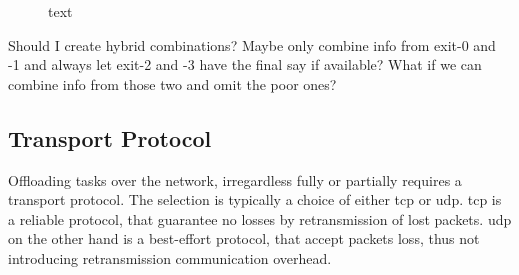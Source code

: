 \begin{figure}
	\centering
	\hfill
	\caption[short text]{text}
	\label{fig:info-combi}
\end{figure}

Should I create hybrid combinations? Maybe only combine info from exit-0 and -1 and always let exit-2 and -3 have the final say if available? What if we can combine info from those two and omit the poor ones? 


\subsection{Transport Protocol} 

Offloading tasks over the network, irregardless fully or partially requires a transport protocol. The selection is typically a choice of either \gls{tcp} or \gls{udp}. \gls{tcp} is a reliable protocol, that guarantee no losses by retransmission of lost packets. \gls{udp} on the other hand is a best-effort protocol, that accept packets loss, thus not introducing retransmission communication overhead. 


